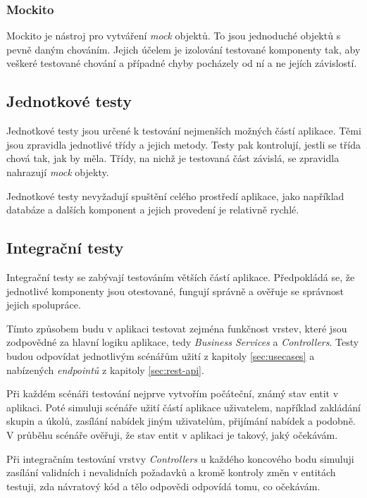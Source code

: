 \documentclass[thesis=B,czech]{FITthesis}[2012/06/26]
\begin{document}
			\subsubsection{Mockito}
			Mockito \cite{mockito} je nástroj pro vytváření \textit{mock} objektů. To jsou jednoduché  objektů s pevně daným chováním. Jejich účelem je izolování testované komponenty tak, aby veškeré testované chování a případné chyby pocházely od ní a ne jejích závislostí.
		
		\subsection{Jednotkové testy}
			Jednotkové testy jsou určené k testování nejmenších možných částí aplikace. Těmi jsou zpravidla jednotlivé třídy a jejich metody. Testy pak kontrolují, jestli se třída chová tak, jak by měla. Třídy, na nichž je testovaná část závislá, se zpravidla nahrazují \textit{mock} objekty.
			
			Jednotkové testy nevyžadují spuštění celého prostředí aplikace, jako například databáze a dalších komponent a jejich provedení je relativně rychlé. 
		
		\subsection{Integrační testy}
			Integrační testy se zabývají testováním větších částí aplikace. Předpokládá se, že jednotlivé komponenty jsou otestované, fungují správně a ověřuje se správnost jejich spolupráce.
			
			Tímto způsobem budu v aplikaci testovat zejména funkčnost vrstev, které jsou zodpovědné za hlavní logiku aplikace, tedy \textit{Business Services} a \textit{Controllers}. Testy budou odpovídat jednotlivým scénářům užití z kapitoly \ref{sec:usecases} a nabízených \textit{endpointů} z kapitoly \ref{sec:rest-api}.
			
			Při každém scénáři testování nejprve vytvořím počáteční, známý stav entit v aplikaci. Poté simuluji scénáře užití částí aplikace uživatelem, například zakládání skupin a úkolů, zasílání nabídek jiným uživatelům, přijímání nabídek a podobně. V průběhu scénáře ověřuji, že stav entit v aplikaci je takový, jaký očekávám.
			
			Při integračním testování vrstvy \textit{Controllers} u každého koncového bodu simuluji zasílání validních i nevalidních požadavků a kromě kontroly změn v entitách testuji, zda návratový kód a tělo odpovědi odpovídá tomu, co očekávám.
\end{document}
